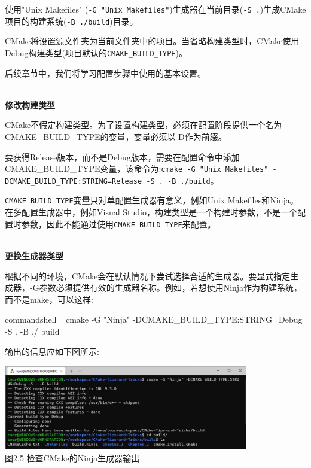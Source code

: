 使用"Unix Makefiles" (\texttt{-G "Unix Makefiles"})生成器在当前目录(\texttt{-S .})生成CMake项目的构建系统(\texttt{-B ./build})目录。

CMake将设置源文件夹为当前文件夹中的项目。当省略构建类型时，CMake使用Debug构建类型(项目默认的\texttt{CMAKE\_BUILD\_TYPE})。

后续章节中，我们将学习配置步骤中使用的基本设置。

\hspace*{\fill} \\ %
\noindent
\textbf{修改构建类型}

CMake不假定构建类型。为了设置构建类型，必须在配置阶段提供一个名为CMAKE\_BUILD\_TYPE的变量，变量必须以-D作为前缀。

要获得Release版本，而不是Debug版本，需要在配置命令中添加CMAKE\_BUILD\_TYPE变量，该命令为:\texttt{cmake -G "Unix Makefiles" -DCMAKE\_BUILD\_TYPE:STRING=Release -S . -B ./build}。

\begin{tcolorbox}[colback=webgreen!5!white,colframe=webgreen!75!black,title=Note]
\texttt{CMAKE\_BUILD\_TYPE}变量只对单配置生成器有意义，例如Unix Makefiles和Ninja。在多配置生成器中，例如Visual Studio，构建类型是一个构建时参数，不是一个配置时参数，因此不能通过使用\texttt{CMAKE\_BUILD\_TYPE}来配置。
\end{tcolorbox}

\hspace*{\fill} \\ %
\noindent
\textbf{更换生成器类型}

根据不同的环境，CMake会在默认情况下尝试选择合适的生成器。要显式指定生成器，-G参数必须提供有效的生成器名称。例如，若想使用Ninja作为构建系统，而不是make，可以这样:

\begin{tcblisting}{commandshell={}}
cmake -G "Ninja" -DCMAKE_BUILD_TYPE:STRING=Debug -S . -B ./
build
\end{tcblisting}

输出的信息应如下图所示:

\begin{center}
\includegraphics[width=0.8\textwidth]{content/1/chapter2/images/5.jpg}\\
图2.5 检查CMake的Ninja生成器输出
\end{center}

